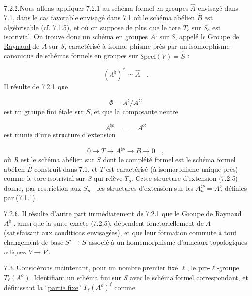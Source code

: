 7.2.2.\quad Nous allons appliquer 7.2.1 au schéma formel en groupes $\hat{A}$ envisagé dans 7.1, dans le cas favorable envisagé dans 7.1 où le schéma abélien $\hat{B}$ est algébrisable (cf. 7.1.5), et où on suppose de plus que le tore $T_{o}$ sur $S_{o}$ est isotrivial. On trouve donc un schéma en groupes $A^{\natural}$ sur $S$, appelé le \underline{Groupe de Raynaud} de $A$ sur $S$, caractérisé à isomor%
phisme près par un isomorphisme canonique de schémas formels en groupes sur $\mathrm{Specf}(V) = \hat{S}$ :

\begin{equation}\tag{7.2.3}
(A^{\natural})^{\wedge} \simeq \hat{A} \quad .
\end{equation}
Il résulte de 7.2.1 que

\begin{equation}\tag{7.2.4}
\Phi = A^{\natural}/A^{\natural o}
\end{equation}
est un groupe fini étale sur $S$, et que la composante neutre

\begin{equation*}
A^{\natural o} \quad = \quad A^{o\natural}
\end{equation*}
est munie d'une structure d'extension

\begin{equation}\tag{7.2.5}
0 \longrightarrow T \longrightarrow A^{\natural o} \longrightarrow B \longrightarrow 0 \quad ,
\end{equation}
où $B$ est le schéma abélien sur $S$ dont le complété formel est le schéma formel abélien $\hat{B}$ construit dans 7.1, et $T$ est caractérisé (à isomorphisme unique près) comme le tore isotrivial sur $S$ qui relève $T_{o}$. Cette structure d'extension (7.2.5) donne, par restriction aux $S_{n}$ , les structures d'extension sur les $A_{n}^{\natural o} = A_{n}^{o}$ définies par (7.1.1).

7.2.6. Il résulte d'autre part immédiatement de 7.2.1 que le Groupe de Raynaud $A^{\natural}$ , ainsi que la suite exacte (7.2.5), dépendent fonctoriellement de $A$ (satisfaisant aux conditions envisagées), et que leur formation commute à tout changement de base $S' \longrightarrow S$ associé à un homomorphisme d'anneaux topologiques adiques $V \longrightarrow V'$.

7.3. Considérons maintenant, pour un nombre premier fixé $\ell$, le pro-$\ell$-groupe $T_{\ell}(A^{o})$. Identifiant un schéma fini sur $S$ avec le schéma formel correspondant, et définissant la ``\underline{partie fixe}'' $T_{\ell}(A^{o})^{f}$ comme


